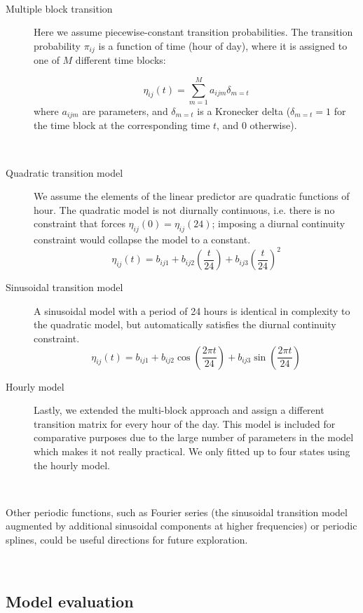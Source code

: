 \documentclass{bmcart}
\begin{document}
\

\begin{description}
\item[Multiple block transition] Here we assume piecewise-constant transition probabilities. The transition probability $\pi_{ij}$ is a function of time (hour of day), where it is assigned to one of $M$ different time blocks:

$$
\eta_{ij}(t) = \sum_{m=1}^{M}a_{ijm} \delta_{m=t}
$$
where $a_{ijm}$ are parameters, and $\delta_{m=t}$ is a Kronecker delta ($\delta_{m=t}=1$ for the time block at the corresponding time $t$, and 0 otherwise). 

\


\item[Quadratic transition model] We assume the elements of the linear predictor
are quadratic functions of hour. The quadratic model is not diurnally continuous, i.e. there is no constraint that forces $\eta_{ij}(0)=\eta_{ij}(24)$; imposing a diurnal continuity constraint would collapse the model to a constant.
$$
\eta_{ij}(t) = b_{ij1}+b_{ij2}\left(\frac{t}{24}\right)+b_{ij3}\left(\frac{t}{24}\right)^{2}
$$

\item[Sinusoidal transition model] A sinusoidal model with a period of 24 hours is identical in complexity to the quadratic model, but automatically satisfies the diurnal continuity constraint.
$$
\eta_{ij}(t)= b_{ij1}+b_{ij2}\cos\left(\frac{2\pi t}{24}\right)+b_{ij3}\sin\left(\frac{2\pi t}{24}\right)
$$

\item[Hourly model] Lastly, we extended the multi-block approach and assign  a different transition matrix for every hour of the day. This model is included for comparative purposes due to the large number of parameters in the model which makes it not really practical. We only fitted up to four states using the hourly model.  
\end{description}

\

Other periodic functions, such as Fourier series (the sinusoidal transition model augmented by additional sinusoidal components at higher frequencies) or periodic splines, could be useful directions for future exploration.

\

\subsection{Model evaluation}
\end{document}
